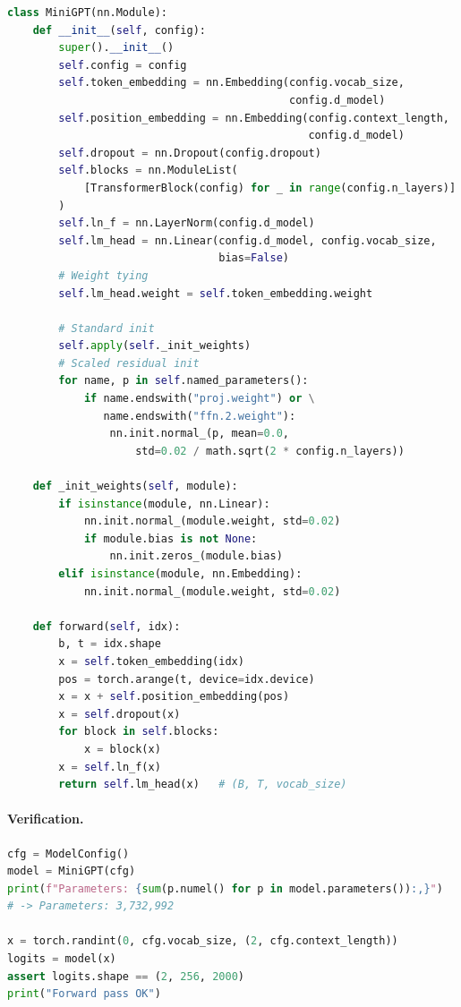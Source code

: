 \begin{lstlisting}[language=python, caption={MiniGPT model}]
class MiniGPT(nn.Module):
    def __init__(self, config):
        super().__init__()
        self.config = config
        self.token_embedding = nn.Embedding(config.vocab_size,
                                            config.d_model)
        self.position_embedding = nn.Embedding(config.context_length,
                                               config.d_model)
        self.dropout = nn.Dropout(config.dropout)
        self.blocks = nn.ModuleList(
            [TransformerBlock(config) for _ in range(config.n_layers)]
        )
        self.ln_f = nn.LayerNorm(config.d_model)
        self.lm_head = nn.Linear(config.d_model, config.vocab_size,
                                 bias=False)
        # Weight tying
        self.lm_head.weight = self.token_embedding.weight

        # Standard init
        self.apply(self._init_weights)
        # Scaled residual init
        for name, p in self.named_parameters():
            if name.endswith("proj.weight") or \
               name.endswith("ffn.2.weight"):
                nn.init.normal_(p, mean=0.0,
                    std=0.02 / math.sqrt(2 * config.n_layers))

    def _init_weights(self, module):
        if isinstance(module, nn.Linear):
            nn.init.normal_(module.weight, std=0.02)
            if module.bias is not None:
                nn.init.zeros_(module.bias)
        elif isinstance(module, nn.Embedding):
            nn.init.normal_(module.weight, std=0.02)

    def forward(self, idx):
        b, t = idx.shape
        x = self.token_embedding(idx)
        pos = torch.arange(t, device=idx.device)
        x = x + self.position_embedding(pos)
        x = self.dropout(x)
        for block in self.blocks:
            x = block(x)
        x = self.ln_f(x)
        return self.lm_head(x)   # (B, T, vocab_size)
\end{lstlisting}

\paragraph{Verification.}

\begin{lstlisting}[language=python, caption={Model verification}]
cfg = ModelConfig()
model = MiniGPT(cfg)
print(f"Parameters: {sum(p.numel() for p in model.parameters()):,}")
# -> Parameters: 3,732,992

x = torch.randint(0, cfg.vocab_size, (2, cfg.context_length))
logits = model(x)
assert logits.shape == (2, 256, 2000)
print("Forward pass OK")
\end{lstlisting}

